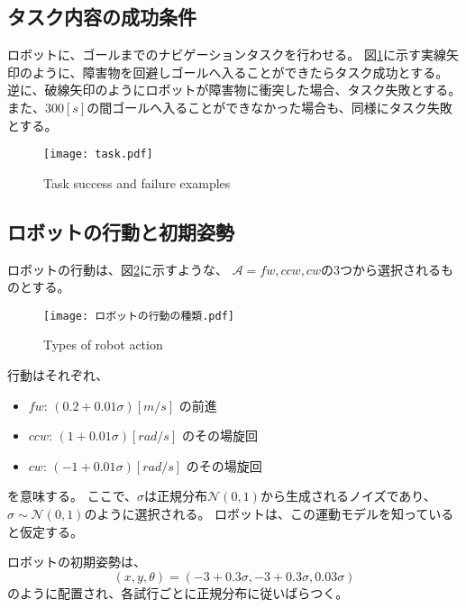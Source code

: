 \subsection{タスク内容の成功条件}
ロボットに、ゴールまでのナビゲーションタスクを行わせる。
図\ref{fig:task}に示す実線矢印のように、障害物を回避しゴールへ入ることができたらタスク成功とする。
逆に、破線矢印のようにロボットが障害物に衝突した場合、タスク失敗とする。
また、$300[\si{s}]$の間ゴールへ入ることができなかった場合も、同様にタスク失敗とする。

\begin{figure}[H]
  \begin{center}
    \texttt{[image: task.pdf]}
    \caption{Task success and failure examples}
    \label{fig:task}
  \end{center}
\end{figure}

\subsection{ロボットの行動と初期姿勢}
ロボットの行動は、図\ref{fig:ロボットの行動の種類}に示すような、
$\mathcal{A} = { fw, ccw, cw }$の3つから選択されるものとする。

\begin{figure}[H]
  \begin{center}
    \texttt{[image: ロボットの行動の種類.pdf]}
    \caption{Types of robot action}
    \label{fig:ロボットの行動の種類}
  \end{center}
\end{figure}

行動はそれぞれ、
\begin{itemize}
  \item $fw$: $(0.2 + 0.01\sigma) \si{[m/s]}$ の前進
  \item $ccw$: $(1 + 0.01\sigma) \si{[rad/s]}$ のその場旋回
  \item $cw$: $(-1 + 0.01\sigma) \si{[rad/s]}$ のその場旋回
\end{itemize}
を意味する。
ここで、$\sigma$は正規分布$\mathcal{N}(0, 1)$から生成されるノイズであり、$\sigma \sim \mathcal{{N}}(0, 1)$のように選択される。
ロボットは、この運動モデルを知っていると仮定する。

ロボットの初期姿勢は、
\begin{equation}
\label{robot initial pose}
  (x, y, \theta) = (-3 + 0.3\sigma, -3 + 0.3\sigma, 0.03\sigma)
\end{equation}
のように配置され、各試行ごとに正規分布に従いばらつく。

